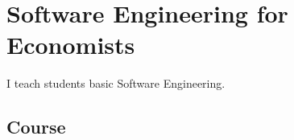 \section{Software Engineering for Economists}

I teach students basic Software Engineering.

\subsection{Course}


